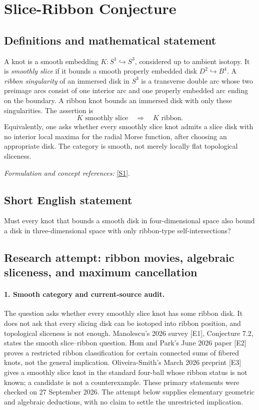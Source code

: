 \documentclass[11pt]{article}
\begin{document}
\section*{\texorpdfstring{Slice-Ribbon Conjecture}{Slice-Ribbon Conjecture}}\label{301}
\subsection{Definitions and mathematical statement}
A knot is a smooth embedding $K:S^1\hookrightarrow S^3$, considered up to ambient isotopy. It is \emph{smoothly slice} if it bounds a smooth properly embedded disk $D^2\hookrightarrow B^4$. A \emph{ribbon singularity} of an immersed disk in $S^3$ is a transverse double arc whose two preimage arcs consist of one interior arc and one properly embedded arc ending on the boundary. A ribbon knot bounds an immersed disk with only these singularities. The assertion is
\[
 K\text{ smoothly slice}\quad\Longrightarrow\quad K\text{ ribbon}.
\]
Equivalently, one asks whether every smoothly slice knot admits a slice disk with no interior local maxima for the radial Morse function, after choosing an appropriate disk. The category is smooth, not merely locally flat topological sliceness.
\par\smallskip\textit{Formulation and concept references:} \href{https://www.openproblemgarden.org/op/slice_ribbon_problem_0}{[S1]}.

\subsection{Short English statement}
Must every knot that bounds a smooth disk in four-dimensional space also bound a disk in three-dimensional space with only ribbon-type self-intersections?
\subsection{Research attempt: ribbon movies, algebraic sliceness, and maximum cancellation}
\paragraph{1. Smooth category and current-source audit.}
The question asks whether every smoothly slice knot has some ribbon disk. It does not ask that every slicing disk can be isotoped into ribbon position, and topological sliceness is not enough. Manolescu's 2026 survey [E1], Conjecture 7.2, states the smooth slice--ribbon question. Hom and Park's June 2026 paper [E2] proves a restricted ribbon classification for certain connected sums of fibered knots, not the general implication. Oliveira-Smith's March 2026 preprint [E3] gives a smoothly slice knot in the standard four-ball whose ribbon status is not known; a candidate is not a counterexample. These primary statements were checked on 27 September 2026. The attempt below supplies elementary geometric and algebraic deductions, with no claim to settle the unrestricted implication.
\end{document}
